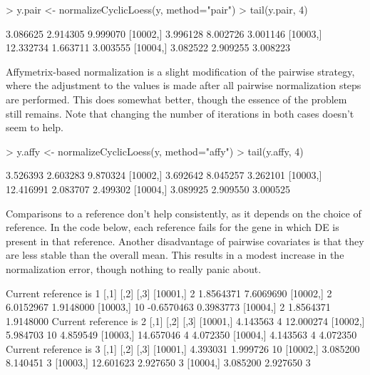 \documentclass[12pt]{report}
\renewenvironment{Schunk}{\vspace{0pt}}{\vspace{0pt}}
\begin{document}
\begin{Schunk}
\begin{Sinput}
> y.pair <- normalizeCyclicLoess(y, method="pair") 
> tail(y.pair, 4)
\end{Sinput}
\begin{Soutput}
              [,1]     [,2]     [,3]
[10001,]  3.086625 2.914305 9.999070
[10002,]  3.996128 8.002726 3.001146
[10003,] 12.332734 1.663711 3.003555
[10004,]  3.082522 2.909255 3.008223
\end{Soutput}
\end{Schunk}

Affymetrix-based normalization is a slight modification of the pairwise strategy, where the adjustment to the values is made after all pairwise normalization steps are performed.
This does somewhat better, though the essence of the problem still remains.
Note that changing the number of iterations in both cases doesn't seem to help.

\begin{Schunk}
\begin{Sinput}
> y.affy <- normalizeCyclicLoess(y, method="affy") 
> tail(y.affy, 4)
\end{Sinput}
\begin{Soutput}
              [,1]     [,2]     [,3]
[10001,]  3.526393 2.603283 9.870324
[10002,]  3.692642 8.045257 3.262101
[10003,] 12.416991 2.083707 2.499302
[10004,]  3.089925 2.909550 3.000525
\end{Soutput}
\end{Schunk}

Comparisons to a reference don't help consistently, as it depends on the choice of reference.
In the code below, each reference fails for the gene in which DE is present in that reference.
Another disadvantage of pairwise covariates is that they are less stable than the overall mean.
This results in a modest increase in the normalization error, though nothing to really panic about.

\begin{Schunk}
\begin{Soutput}
Current reference is 1 
         [,1]       [,2]      [,3]
[10001,]    2  1.8564371 7.6069690
[10002,]    2  6.0152967 1.9148000
[10003,]   10 -0.6570463 0.3983773
[10004,]    2  1.8564371 1.9148000
Current reference is 2 
              [,1] [,2]      [,3]
[10001,]  4.143563    4 12.000274
[10002,]  5.984703   10  4.859549
[10003,] 14.657046    4  4.072350
[10004,]  4.143563    4  4.072350
Current reference is 3 
              [,1]     [,2] [,3]
[10001,]  4.393031 1.999726   10
[10002,]  3.085200 8.140451    3
[10003,] 12.601623 2.927650    3
[10004,]  3.085200 2.927650    3
\end{Soutput}
\end{Schunk}
\end{document}
